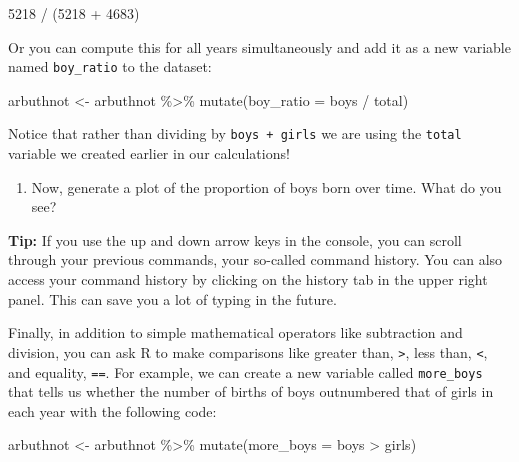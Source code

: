 \documentclass[
]{article}
\newenvironment{Shaded}{\begin{snugshade}}{\end{snugshade}}
\newcommand{\AttributeTok}[1]{\textcolor[rgb]{0.77,0.63,0.00}{#1}}
\newcommand{\DecValTok}[1]{\textcolor[rgb]{0.00,0.00,0.81}{#1}}
\newcommand{\FunctionTok}[1]{\textcolor[rgb]{0.00,0.00,0.00}{#1}}
\newcommand{\NormalTok}[1]{#1}
\newcommand{\OtherTok}[1]{\textcolor[rgb]{0.56,0.35,0.01}{#1}}
\newcommand{\SpecialCharTok}[1]{\textcolor[rgb]{0.00,0.00,0.00}{#1}}
\providecommand{\tightlist}{%
  \setlength{\itemsep}{0pt}\setlength{\parskip}{0pt}}
\begin{document}
\begin{Shaded}
\begin{Highlighting}[]
\DecValTok{5218} \SpecialCharTok{/}\NormalTok{ (}\DecValTok{5218} \SpecialCharTok{+} \DecValTok{4683}\NormalTok{)}
\end{Highlighting}
\end{Shaded}

Or you can compute this for all years simultaneously and add it as a new variable named \texttt{boy\_ratio} to the dataset:

\begin{Shaded}
\begin{Highlighting}[]
\NormalTok{arbuthnot }\OtherTok{\textless{}{-}}\NormalTok{ arbuthnot }\SpecialCharTok{\%\textgreater{}\%}
  \FunctionTok{mutate}\NormalTok{(}\AttributeTok{boy\_ratio =}\NormalTok{ boys }\SpecialCharTok{/}\NormalTok{ total)}
\end{Highlighting}
\end{Shaded}

Notice that rather than dividing by \texttt{boys\ +\ girls} we are using the \texttt{total} variable we created earlier in our calculations!

\begin{enumerate}
\def\labelenumi{\arabic{enumi}.}
\setcounter{enumi}{2}
\tightlist
\item
  Now, generate a plot of the proportion of boys born over time. What do you see?
\end{enumerate}

\textbf{Tip:} If you use the up and down arrow keys in the console, you can scroll through your previous commands, your so-called command history. You can also access your command history by clicking on the history tab in the upper right panel. This can save you a lot of typing in the future.

Finally, in addition to simple mathematical operators like subtraction and division, you can ask R to make comparisons like greater than, \texttt{\textgreater{}}, less than, \texttt{\textless{}}, and equality, \texttt{==}. For example, we can create a new variable called \texttt{more\_boys} that tells us whether the number of births of boys outnumbered that of girls in each year with the following code:

\begin{Shaded}
\begin{Highlighting}[]
\NormalTok{arbuthnot }\OtherTok{\textless{}{-}}\NormalTok{ arbuthnot }\SpecialCharTok{\%\textgreater{}\%}
  \FunctionTok{mutate}\NormalTok{(}\AttributeTok{more\_boys =}\NormalTok{ boys }\SpecialCharTok{\textgreater{}}\NormalTok{ girls)}
\end{Highlighting}
\end{Shaded}
\end{document}
